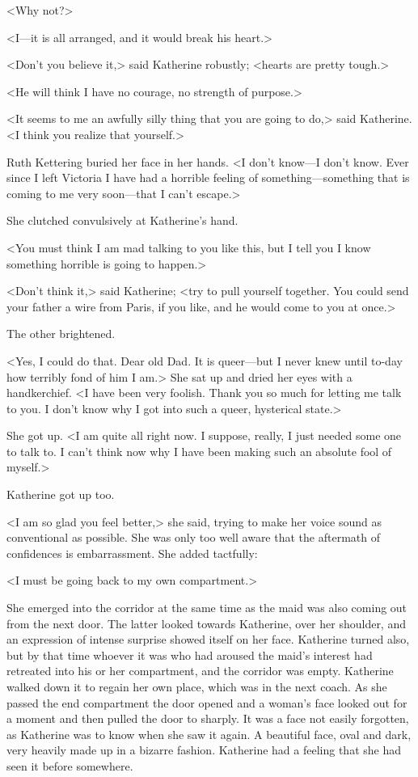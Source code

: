 <Why not?>

<I—it is all arranged, and it would break his heart.>

<Don't you believe it,> said Katherine robustly; <hearts are pretty tough.>

<He will think I have no courage, no strength of purpose.>

<It seems to me an awfully silly thing that you are going to do,> said Katherine. <I think you realize that yourself.>

Ruth Kettering buried her face in her hands. <I don't know—I don't know. Ever since I left Victoria I have had a horrible feeling of something—something that is coming to me very soon—that I can't escape.>

She clutched convulsively at Katherine's hand.

<You must think I am mad talking to you like this, but I tell you I know something horrible is going to happen.>

<Don't think it,> said Katherine; <try to pull yourself together. You could send your father a wire from Paris, if you like, and he would come to you at once.>

The other brightened.

<Yes, I could do that. Dear old Dad. It is queer—but I never knew until to-day how terribly fond of him I am.> She sat up and dried her eyes with a handkerchief. <I have been very foolish. Thank you so much for letting me talk to you. I don't know why I got into such a queer, hysterical state.>

She got up. <I am quite all right now. I suppose, really, I just needed some one to talk to. I can't think now why I have been making such an absolute fool of myself.>

Katherine got up too.

<I am so glad you feel better,> she said, trying to make her voice sound as conventional as possible. She was only too well aware that the aftermath of confidences is embarrassment. She added tactfully:

<I must be going back to my own compartment.>

She emerged into the corridor at the same time as the maid was also coming out from the next door. The latter looked towards Katherine, over her shoulder, and an expression of intense surprise showed itself on her face. Katherine turned also, but by that time whoever it was who had aroused the maid's interest had retreated into his or her compartment, and the corridor was empty. Katherine walked down it to regain her own place, which was in the next coach. As she passed the end compartment the door opened and a woman's face looked out for a moment and then pulled the door to sharply. It was a face not easily forgotten, as Katherine was to know when she saw it again. A beautiful face, oval and dark, very heavily made up in a bizarre fashion. Katherine had a feeling that she had seen it before somewhere.

